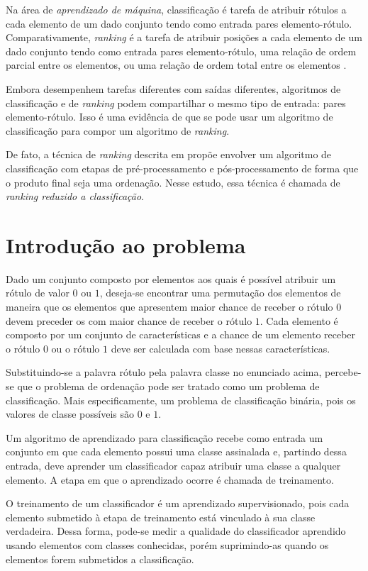 Na área de \emph{aprendizado de máquina}, classificação é tarefa de atribuir rótulos a cada elemento de um dado conjunto tendo como entrada pares elemento-rótulo. Comparativamente, \emph{ranking} é a tarefa de atribuir posições a cada elemento de um dado conjunto tendo como entrada pares elemento-rótulo, uma relação de ordem parcial entre os elementos, ou uma relação de ordem total entre os elementos \cite{tieyan09}.

Embora desempenhem tarefas diferentes com saídas diferentes, algoritmos de classificação e de \emph{ranking} podem compartilhar o mesmo tipo de entrada: pares elemento-rótulo. Isso é uma evidência de que se pode usar um algoritmo de classificação para compor um algoritmo de \emph{ranking}.

De fato, a técnica de \emph{ranking} descrita em \cite{langford08} propõe envolver  um algoritmo de classificação com etapas de pré-processamento e pós-processamento de forma que o produto final seja uma ordenação. Nesse estudo, essa técnica é chamada de \emph{ranking reduzido a classificação}.

\section{Introdução ao problema}

Dado um conjunto composto por elementos aos quais é possível atribuir um rótulo de valor $0$ ou $1$, deseja-se encontrar uma permutação dos elementos de maneira que os elementos que apresentem maior chance de receber o rótulo $0$ devem preceder os com maior chance de receber o rótulo $1$. Cada elemento é composto por um conjunto de características e a chance de um elemento receber o rótulo $0$ ou o rótulo $1$ deve ser calculada com base nessas características.

Substituindo-se a palavra rótulo pela palavra classe no enunciado acima, percebe-se que o problema de ordenação pode ser tratado como um problema de classificação. Mais especificamente, um problema de classificação binária, pois os valores de classe possíveis são $0$ e $1$.

Um algoritmo de aprendizado para classificação recebe como entrada um conjunto em que cada elemento possui uma classe assinalada e, partindo dessa entrada, deve aprender um classificador capaz atribuir uma classe a qualquer elemento. A etapa em que o aprendizado ocorre é chamada de treinamento.

O treinamento de um classificador é um aprendizado supervisionado, pois cada elemento submetido à etapa de treinamento está vinculado à sua classe verdadeira. Dessa forma, pode-se medir a qualidade do classificador aprendido usando elementos com classes conhecidas, porém suprimindo-as quando os elementos forem submetidos a classificação.

